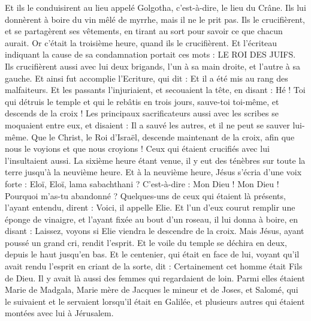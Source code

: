 \begin{multicols}{2}
Et ils le conduisirent au lieu appelé Golgotha, c'est-à-dire, le lieu du Crâne.
Ils lui donnèrent à boire du vin mêlé de myrrhe, mais il ne le prit pas.
Ils le crucifièrent, et se partagèrent ses vêtements, en tirant au sort pour savoir ce que chacun aurait.
Or c’était la troisième heure, quand ils le crucifièrent.
Et l’écriteau indiquant la cause de sa condamnation portait ces mots : LE ROI DES JUIFS.
Ils crucifièrent aussi avec lui deux brigands, l'un à sa main droite, et l'autre à sa gauche.
Et ainsi fut accomplie l'Ecriture, qui dit : Et il a été mis au rang des malfaiteurs.
Et les passants l’injuriaient, et secouaient la tête, en disant : Hé ! Toi qui détruis le temple et qui le rebâtis en trois jours,
sauve-toi toi-même, et descends de la croix !
Les principaux sacrificateurs aussi avec les scribes se moquaient entre eux, et disaient : Il a sauvé les autres, et il ne peut se sauver lui-même.
Que le Christ, le Roi d’Israël, descende maintenant de la croix, afin que nous le voyions et que nous croyions ! Ceux qui étaient crucifiés avec lui l’insultaient aussi.
La sixième heure étant venue, il y eut des ténèbres sur toute la terre jusqu'à la neuvième heure.
Et à la neuvième heure, Jésus s’écria d’une voix forte : Eloï, Eloï, lama sabachthani ? C’est-à-dire : Mon Dieu ! Mon Dieu ! Pourquoi m'as-tu abandonné ?
Quelques-uns de ceux qui étaient là présents, l’ayant entendu, dirent : Voici, il appelle Elie.
Et l’un d’eux courut remplir une éponge de vinaigre, et l'ayant fixée au bout d'un roseau, il lui donna à boire, en disant : Laissez, voyons si Elie viendra le descendre de la croix.
Mais Jésus, ayant poussé un grand cri, rendit l’esprit.
Et le voile du temple se déchira en deux, depuis le haut jusqu'en bas.
Et le centenier, qui était en face de lui, voyant qu'il avait rendu l'esprit en criant de la sorte, dit : Certainement cet homme était Fils de Dieu.
Il y avait là aussi des femmes qui regardaient de loin. Parmi elles étaient Marie de Madgala, Marie mère de Jacques le mineur et de Joses, et Salomé,
qui le suivaient et le servaient lorsqu'il était en Galilée, et plusieurs autres qui étaient montées avec lui à Jérusalem.

\end{multicols}
